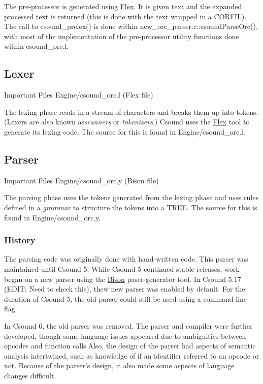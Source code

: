 \documentclass[]{book}
\begin{document}
The pre-processor is generated using \href{http://flex.sourceforge.net/}{Flex}. It is given text and the expanded processed text is returned (this is done with the text wrapped in a CORFIL). The call to csound\_prelex() is done within new\_orc\_parser.c::csoundParseOrc(), with most of the implementation of the pre-processor utility functions done within csound\_pre.l.

\subsection{Lexer}

\begin{bclogo}[couleur=blue!30,arrondi=0.1,ombre=true,logo=\bcetoile]
{Important Files}
Engine/csound\_orc.l (Flex file)
\end{bclogo}

The lexing phase reads in a stream of characters and breaks them up into
tokens. (Lexers are also known as\emph{scanners} or \emph{tokenizers}.)
Csound uses the \href{http://flex.sourceforge.net/}{Flex} tool to
generate its lexing code. The source for this is found in
Engine/csound\_orc.l.


\subsection{Parser}

\begin{bclogo}[couleur=blue!30,arrondi=0.1,ombre=true,logo=\bcetoile]
{Important Files}
Engine/csound\_orc.y (Bison file)
\end{bclogo}

The parsing phase uses the tokens generated from the lexing phase and
uses rules defined in a \emph{grammar} to structure the tokens into a
TREE.  The source for this is found in Engine/csound\_orc.y.

\subsubsection{History}
The parsing code was originally done with hand-written code. This parser was maintained until Csound 5.  While Csound 5 continued stable releases, work began on a new parser using the \href{http://www.gnu.org/software/bison/}{Bison} paser-generator tool. In Csound 5.17 (EDIT: Need to check this), thew new parser was enabled by default. For the duration of Csound 5, the old parser could still be used using a command-line flag. 

In Csound 6, the old parser was removed. The parser and compiler were further developed, though some language issues appeared due to ambiguities between opcodes and function calls.Also, the design of the parser had aspects of semantic analysis intertwined, such as knowledge of if an identifier referred to an opcode or not.  Because of the parser's design, it also made some aspects of language changes difficult.
\end{document}
